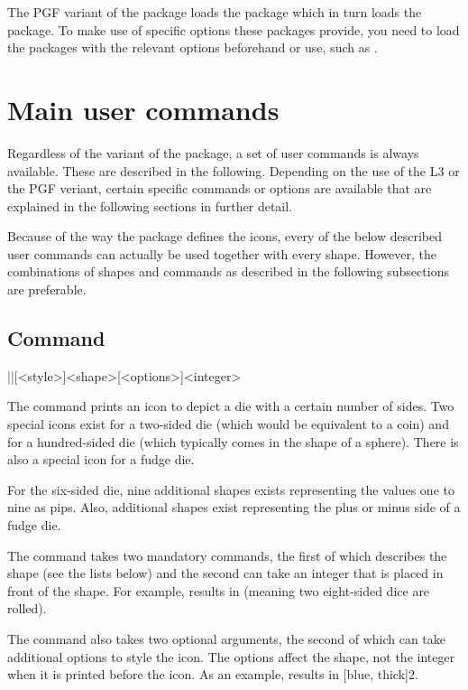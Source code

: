 \documentclass[a4paper]{article}
\begin{document}
The PGF variant of the package loads the  package which in turn loads the  package. To make use of specific options these packages provide, you need to load the packages with the relevant options beforehand or use, such as .

\section{Main user commands}

Regardless of the variant of the package, a set of user commands is always available. These are described in the following. Depending on the use of the L3 or the PGF veriant, certain specific commands or options are available that are explained in the following sections in further detail.

Because of the way the package defines the icons, every of the below described user commands can actually be used together with every shape. However, the combinations of shapes and commands as described in the following subsections are preferable.

\subsection[Command \textbackslash die]{Command }

\begin{macrodef}|\die|[<style>]{<shape>}[<options>]{<integer>}\end{macrodef}
The command \macro{\die} prints an icon to depict a die with a certain number of sides. Two special icons exist for a two-sided die (which would be equivalent to a coin) and for a hundred-sided die (which typically comes in the shape of a sphere). There is also a special icon for a fudge die. 

For the six-sided die, nine additional shapes exists representing the values one to nine as pips. Also, additional shapes exist representing the plus or minus side of a fudge die.

The command takes two mandatory commands, the first of which describes the shape (see the lists below) and the second can take an integer that is placed in front of the shape. For example,  results in  (meaning two eight-sided dice are rolled).

The command also takes two optional arguments, the second of which can take additional options to style the icon. The options affect the shape, not the integer when it is printed before the icon. As an example,  results in [blue, thick]{2}.
\end{document}
